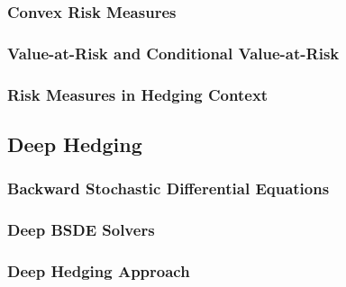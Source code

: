 

\subsubsection{Convex Risk Measures}



\subsubsection{Value-at-Risk and Conditional Value-at-Risk}



\subsubsection{Risk Measures in Hedging Context}




\subsection{Deep Hedging}
\label{subsec:deep_hedging}

\subsubsection{Backward Stochastic Differential Equations}



\subsubsection{Deep BSDE Solvers}



\subsubsection{Deep Hedging Approach}

